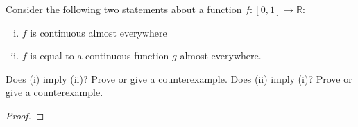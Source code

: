 \documentclass{article}
\newenvironment{problem}[2][Problem]{\begin{trivlist}
\item[\hskip \labelsep {\bfseries #1}\hskip \labelsep {\bfseries #2.}]}{\end{trivlist}}
\begin{document}
\pagebreak

\begin{problem}{4}
  Consider the following two statements about a function $f: [0, 1] \rightarrow \mathbb{R}$:
  \begin{enumerate}[(i)]
    \item $f$ is continuous almost everywhere
    \item $f$ is equal to a continuous function $g$ almost everywhere.
  \end{enumerate}
  Does (i) imply (ii)? Prove or give a counterexample.
  Does (ii) imply (i)? Prove or give a counterexample.
\end{problem}

\begin{proof}
\end{proof}
\end{document}
